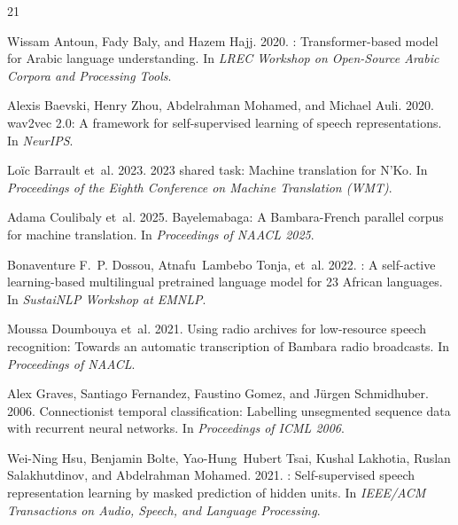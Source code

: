 \documentclass[11pt]{article}
\begin{document}
\begin{thebibliography}{21}
\providecommand{\natexlab}[1]{#1}

Wissam Antoun, Fady Baly, and Hazem Hajj. 2020.
: Transformer-based model for {Arabic} language understanding.
\newblock In \emph{LREC Workshop on Open-Source Arabic Corpora and Processing Tools}.

Alexis Baevski, Henry Zhou, Abdelrahman Mohamed, and Michael Auli. 2020.
\newblock wav2vec 2.0: A framework for self-supervised learning of speech representations.
\newblock In \emph{NeurIPS}.

Lo\"{i}c Barrault et~al. 2023.
 2023 shared task: Machine translation for {N'Ko}.
\newblock In \emph{Proceedings of the Eighth Conference on Machine Translation (WMT)}.

Adama Coulibaly et~al. 2025.
\newblock Bayelemabaga: A {Bambara}-{French} parallel corpus for machine translation.
\newblock In \emph{Proceedings of NAACL 2025}.

Bonaventure F.~P. Dossou, Atnafu~Lambebo Tonja, et~al. 2022.
: A self-active learning-based multilingual pretrained language model for 23 {African} languages.
\newblock In \emph{SustaiNLP Workshop at EMNLP}.

Moussa Doumbouya et~al. 2021.
\newblock Using radio archives for low-resource speech recognition: Towards an automatic transcription of {Bambara} radio broadcasts.
\newblock In \emph{Proceedings of NAACL}.

Alex Graves, Santiago Fernandez, Faustino Gomez, and J\"{u}rgen Schmidhuber. 2006.
\newblock Connectionist temporal classification: Labelling unsegmented sequence data with recurrent neural networks.
\newblock In \emph{Proceedings of ICML 2006}.

Wei-Ning Hsu, Benjamin Bolte, Yao-Hung~Hubert Tsai, Kushal Lakhotia, Ruslan Salakhutdinov, and Abdelrahman Mohamed. 2021.
: Self-supervised speech representation learning by masked prediction of hidden units.
\newblock In \emph{IEEE/ACM Transactions on Audio, Speech, and Language Processing}.


\end{thebibliography}
\end{document}
